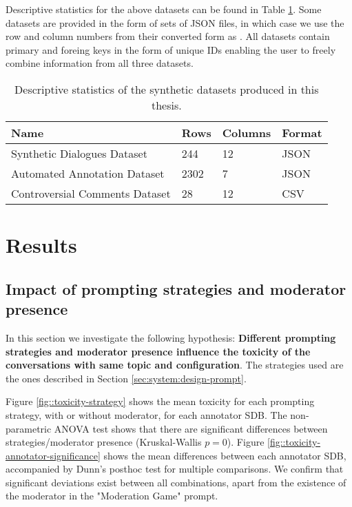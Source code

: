 Descriptive statistics for the above datasets can be found in Table \ref{tab:datasets}. Some datasets are provided in the form of sets of JSON files, in which case we use the row and column numbers from their converted form as . All datasets contain primary and foreing keys in the form of unique IDs enabling the user to freely combine information from all three datasets.


\begin{table}
	\begin{tabular}
		{ |p{6cm}|p{1cm}|p{1.5cm}|p{2cm}|}
		\hline
		\cellcolor{blue!25}\textbf{Name} & \cellcolor{blue!25}\textbf{Rows} & \cellcolor{blue!25}\textbf{Columns} & \cellcolor{blue!25}\textbf{Format}\\
		\hline
		Synthetic Dialogues Dataset & 244 & 12 & JSON\\
		\hline
		Automated Annotation Dataset & 2302 & 7 & JSON\\
		\hline
		Controversial Comments Dataset & 28 & 12 & CSV\\
		\hline
	\end{tabular}
	\caption{Descriptive statistics of the synthetic datasets produced in this thesis.}
	\label{tab:datasets}
\end{table}



\section{Results}
\label{sec:evaluation:analysis}

\subsection{Impact of prompting strategies and moderator presence}
\label{ssec:evaluation:users}

In this section we investigate the following hypothesis: \textbf{Different prompting strategies and moderator presence influence the toxicity of the conversations with same topic and configuration}. The strategies used are the ones described in Section \ref{sec:system:design-prompt}.

Figure \ref{fig::toxicity-strategy} shows the mean toxicity for each prompting strategy, with or without moderator, for each annotator SDB. The non-parametric ANOVA test shows that there are significant differences between strategies/moderator presence (Kruskal-Wallis $p=0$). Figure \ref{fig::toxicity-annotator-significance} shows the mean differences between each annotator SDB, accompanied by Dunn's posthoc test for multiple comparisons. We confirm that significant deviations exist between all combinations, apart from the existence of the moderator in the "Moderation Game" prompt.

